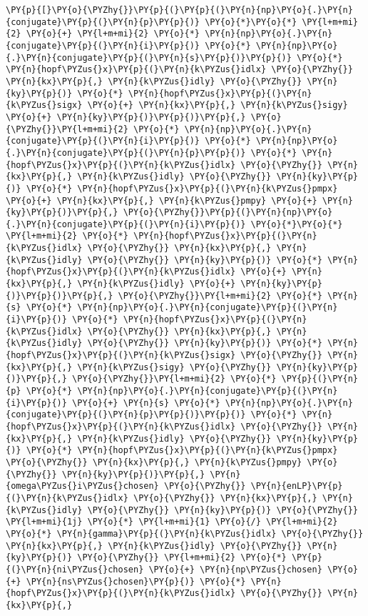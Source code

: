 \begin{Verbatim}[commandchars=\\\{\}]
         \PY{p}{[}\PY{o}{\PYZhy{}}\PY{p}{(}\PY{p}{(}\PY{n}{np}\PY{o}{.}\PY{n}{conjugate}\PY{p}{(}\PY{n}{p}\PY{p}{)} \PY{o}{*}\PY{o}{*} \PY{l+m+mi}{2} \PY{o}{+} \PY{l+m+mi}{2} \PY{o}{*} \PY{n}{np}\PY{o}{.}\PY{n}{conjugate}\PY{p}{(}\PY{n}{i}\PY{p}{)} \PY{o}{*} \PY{n}{np}\PY{o}{.}\PY{n}{conjugate}\PY{p}{(}\PY{n}{s}\PY{p}{)}\PY{p}{)} \PY{o}{*} \PY{n}{hopf\PYZus{}x}\PY{p}{(}\PY{n}{k\PYZus{}idlx} \PY{o}{\PYZhy{}} \PY{n}{kx}\PY{p}{,} \PY{n}{k\PYZus{}idly} \PY{o}{\PYZhy{}} \PY{n}{ky}\PY{p}{)} \PY{o}{*} \PY{n}{hopf\PYZus{}x}\PY{p}{(}\PY{n}{k\PYZus{}sigx} \PY{o}{+} \PY{n}{kx}\PY{p}{,} \PY{n}{k\PYZus{}sigy} \PY{o}{+} \PY{n}{ky}\PY{p}{)}\PY{p}{)}\PY{p}{,} \PY{o}{\PYZhy{}}\PY{l+m+mi}{2} \PY{o}{*} \PY{n}{np}\PY{o}{.}\PY{n}{conjugate}\PY{p}{(}\PY{n}{i}\PY{p}{)} \PY{o}{*} \PY{n}{np}\PY{o}{.}\PY{n}{conjugate}\PY{p}{(}\PY{n}{p}\PY{p}{)} \PY{o}{*} \PY{n}{hopf\PYZus{}x}\PY{p}{(}\PY{n}{k\PYZus{}idlx} \PY{o}{\PYZhy{}} \PY{n}{kx}\PY{p}{,} \PY{n}{k\PYZus{}idly} \PY{o}{\PYZhy{}} \PY{n}{ky}\PY{p}{)} \PY{o}{*} \PY{n}{hopf\PYZus{}x}\PY{p}{(}\PY{n}{k\PYZus{}pmpx} \PY{o}{+} \PY{n}{kx}\PY{p}{,} \PY{n}{k\PYZus{}pmpy} \PY{o}{+} \PY{n}{ky}\PY{p}{)}\PY{p}{,} \PY{o}{\PYZhy{}}\PY{p}{(}\PY{n}{np}\PY{o}{.}\PY{n}{conjugate}\PY{p}{(}\PY{n}{i}\PY{p}{)} \PY{o}{*}\PY{o}{*} \PY{l+m+mi}{2} \PY{o}{*} \PY{n}{hopf\PYZus{}x}\PY{p}{(}\PY{n}{k\PYZus{}idlx} \PY{o}{\PYZhy{}} \PY{n}{kx}\PY{p}{,} \PY{n}{k\PYZus{}idly} \PY{o}{\PYZhy{}} \PY{n}{ky}\PY{p}{)} \PY{o}{*} \PY{n}{hopf\PYZus{}x}\PY{p}{(}\PY{n}{k\PYZus{}idlx} \PY{o}{+} \PY{n}{kx}\PY{p}{,} \PY{n}{k\PYZus{}idly} \PY{o}{+} \PY{n}{ky}\PY{p}{)}\PY{p}{)}\PY{p}{,} \PY{o}{\PYZhy{}}\PY{l+m+mi}{2} \PY{o}{*} \PY{n}{s} \PY{o}{*} \PY{n}{np}\PY{o}{.}\PY{n}{conjugate}\PY{p}{(}\PY{n}{i}\PY{p}{)} \PY{o}{*} \PY{n}{hopf\PYZus{}x}\PY{p}{(}\PY{n}{k\PYZus{}idlx} \PY{o}{\PYZhy{}} \PY{n}{kx}\PY{p}{,} \PY{n}{k\PYZus{}idly} \PY{o}{\PYZhy{}} \PY{n}{ky}\PY{p}{)} \PY{o}{*} \PY{n}{hopf\PYZus{}x}\PY{p}{(}\PY{n}{k\PYZus{}sigx} \PY{o}{\PYZhy{}} \PY{n}{kx}\PY{p}{,} \PY{n}{k\PYZus{}sigy} \PY{o}{\PYZhy{}} \PY{n}{ky}\PY{p}{)}\PY{p}{,} \PY{o}{\PYZhy{}}\PY{l+m+mi}{2} \PY{o}{*} \PY{p}{(}\PY{n}{p} \PY{o}{*} \PY{n}{np}\PY{o}{.}\PY{n}{conjugate}\PY{p}{(}\PY{n}{i}\PY{p}{)} \PY{o}{+} \PY{n}{s} \PY{o}{*} \PY{n}{np}\PY{o}{.}\PY{n}{conjugate}\PY{p}{(}\PY{n}{p}\PY{p}{)}\PY{p}{)} \PY{o}{*} \PY{n}{hopf\PYZus{}x}\PY{p}{(}\PY{n}{k\PYZus{}idlx} \PY{o}{\PYZhy{}} \PY{n}{kx}\PY{p}{,} \PY{n}{k\PYZus{}idly} \PY{o}{\PYZhy{}} \PY{n}{ky}\PY{p}{)} \PY{o}{*} \PY{n}{hopf\PYZus{}x}\PY{p}{(}\PY{n}{k\PYZus{}pmpx} \PY{o}{\PYZhy{}} \PY{n}{kx}\PY{p}{,} \PY{n}{k\PYZus{}pmpy} \PY{o}{\PYZhy{}} \PY{n}{ky}\PY{p}{)}\PY{p}{,} \PY{n}{omega\PYZus{}i\PYZus{}chosen} \PY{o}{\PYZhy{}} \PY{n}{enLP}\PY{p}{(}\PY{n}{k\PYZus{}idlx} \PY{o}{\PYZhy{}} \PY{n}{kx}\PY{p}{,} \PY{n}{k\PYZus{}idly} \PY{o}{\PYZhy{}} \PY{n}{ky}\PY{p}{)} \PY{o}{\PYZhy{}} \PY{l+m+mi}{1j} \PY{o}{*} \PY{l+m+mi}{1} \PY{o}{/} \PY{l+m+mi}{2} \PY{o}{*} \PY{n}{gamma}\PY{p}{(}\PY{n}{k\PYZus{}idlx} \PY{o}{\PYZhy{}} \PY{n}{kx}\PY{p}{,} \PY{n}{k\PYZus{}idly} \PY{o}{\PYZhy{}} \PY{n}{ky}\PY{p}{)} \PY{o}{\PYZhy{}} \PY{l+m+mi}{2} \PY{o}{*} \PY{p}{(}\PY{n}{ni\PYZus{}chosen} \PY{o}{+} \PY{n}{np\PYZus{}chosen} \PY{o}{+} \PY{n}{ns\PYZus{}chosen}\PY{p}{)} \PY{o}{*} \PY{n}{hopf\PYZus{}x}\PY{p}{(}\PY{n}{k\PYZus{}idlx} \PY{o}{\PYZhy{}} \PY{n}{kx}\PY{p}{,} 
\end{Verbatim}
